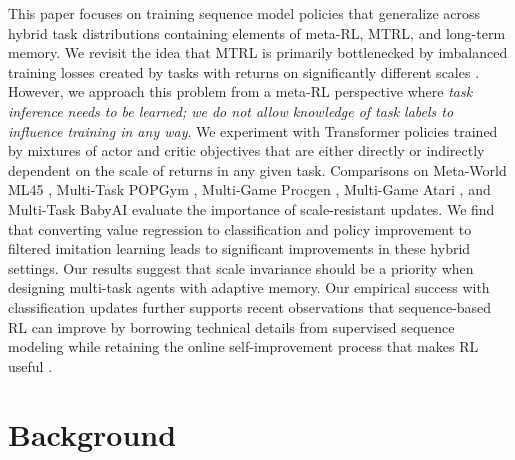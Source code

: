 \documentclass{article}
\begin{document}
This paper focuses on training sequence model policies that generalize across hybrid task distributions containing elements of meta-RL, MTRL, and long-term memory. We revisit the idea that MTRL is primarily bottlenecked by imbalanced training losses created by tasks with returns on significantly different scales \cite{hessel2019multi}. However, we approach this problem from a meta-RL perspective where \textit{task inference needs to be learned; we do not allow knowledge of task labels to influence training in any way}. We experiment with Transformer \cite{vaswani2017attention} policies trained by mixtures of actor and critic objectives that are either directly or indirectly dependent on the scale of returns in any given task. Comparisons on Meta-World ML45 \cite{yu2020meta}, Multi-Task POPGym \cite{morad2023popgym}, Multi-Game Procgen \cite{cobbe2020leveraging}, Multi-Game Atari \cite{bellemare2013arcade}, and Multi-Task BabyAI \cite{chevalier-boisvert2018babyai} evaluate the importance of scale-resistant updates. We find that converting value regression to classification \cite{hafner2023mastering} and policy improvement to filtered imitation learning \cite{wang2020critic} leads to significant improvements in these hybrid settings. Our results suggest that scale invariance should be a priority when designing multi-task agents with adaptive memory. Our empirical success with classification updates further supports recent observations that sequence-based RL can improve by borrowing technical details from supervised sequence modeling \cite{chebotar2023q, farebrother2024stop, springenberg2024offline} while retaining the online self-improvement process that makes RL useful \cite{chen2021decision, lee2022multi}.
\section{Background}
\label{sec:background}
\end{document}
